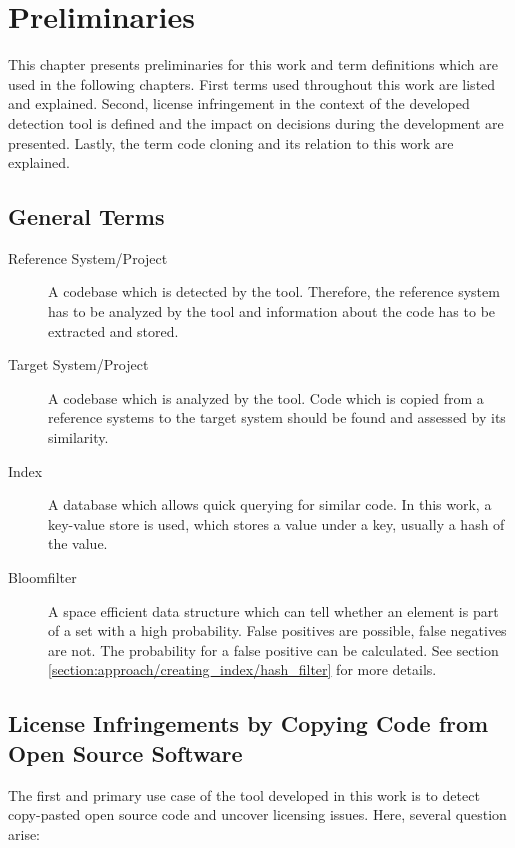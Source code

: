 
\chapter{Preliminaries}\label{chapter:preliminaries}
This chapter presents preliminaries for this work and term definitions which are used in the following chapters.
First terms used throughout this work are listed and explained.
Second, license infringement in the context of the developed detection tool is defined and the impact on decisions during the development are presented.
Lastly, the term code cloning and its relation to this work are explained.

\section{General Terms}
\begin{description}
	\item[Reference System/Project]
		A codebase which is detected by the tool. 
		Therefore, the reference system has to be analyzed by the tool and information about the code has to be extracted and stored.
	\item[Target System/Project]
		A codebase which is analyzed by the tool. 
		Code which is copied from a reference systems to the target system should be found and assessed by its similarity.
	\item[Index] 
		A database which allows quick querying for similar code.
		In this work, a key-value store is used, which stores a value under a key, usually a hash of the value.
	\item [Bloomfilter]
		A space efficient data structure which can tell whether an element is part of a set with a high probability. 
		False positives are possible, false negatives are not.
		The probability for a false positive can be calculated. See section \ref{section:approach/creating_index/hash_filter} for more details.
\end{description}

\section{License Infringements by Copying Code from Open Source Software}\label{section:preliminaries/infringement}
The first and primary use case of the tool developed in this work is to detect copy-pasted open source code and uncover licensing issues.
Here, several question arise:

